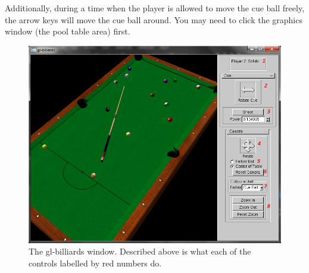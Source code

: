 Additionally, during a time when the player is allowed to move the cue ball freely, the arrow keys will move the cue ball around.
You may need to click the graphics window (the pool table area) first.

\begin{center}
    \begin{figure}[H]
        \includegraphics[scale=0.75]{controls.png}
        \caption{The gl-billiards window. Described above is what each of the controls labelled by red numbers do.}
        \label{fig:controls}
    \end{figure}
\end{center}

